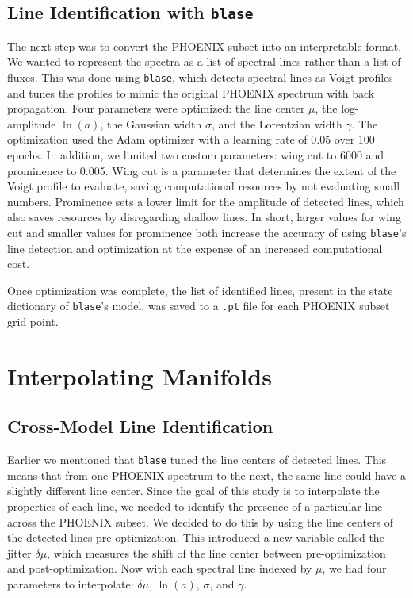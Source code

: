 \documentclass[twocolumn]{aastex631}
\begin{document}
\subsection{Line Identification with \texttt{blase}}
The next step was to convert the PHOENIX subset into an interpretable format.
We wanted to represent the spectra as a list of spectral lines rather than a
list of fluxes. This was done using \texttt{blase}, which detects spectral 
lines as Voigt profiles and tunes the profiles to mimic the original 
PHOENIX spectrum with back propagation. Four parameters were optimized: the 
line center $\mu$, the log-amplitude $\ln(a)$, the Gaussian width $\sigma$, and the 
Lorentzian width $\gamma$. The optimization used the Adam optimizer with a
learning rate of 0.05 over 100 epochs. In addition, we limited two custom 
parameters: wing cut to 6000 and prominence to 0.005. Wing cut is a parameter
that determines the extent of the Voigt profile to evaluate, saving
computational resources by not evaluating small numbers. Prominence sets a
lower limit for the amplitude of detected lines, which also saves resources 
by disregarding shallow lines. In short, larger values for wing cut and 
smaller values for prominence both increase the accuracy of using
\texttt{blase}'s line detection and optimization at the expense of an
increased computational cost.

Once optimization was complete, the list of identified lines, present in the
state dictionary of \texttt{blase}'s model, was saved to a \texttt{.pt} file
for each PHOENIX subset grid point.

\section{Interpolating Manifolds}
\subsection{Cross-Model Line Identification}
Earlier we mentioned that \texttt{blase} tuned the line centers of
detected lines. This means that from one PHOENIX spectrum to the next, the
same line could have a slightly different line center. Since the goal of this
study is to interpolate the properties of each line, we needed to identify the
presence of a particular line across the PHOENIX subset. We decided to do
this by using the line centers of the detected lines pre-optimization. This
introduced a new variable called the jitter $\delta\mu$, which measures the shift of the
line center between pre-optimization and post-optimization. Now with each
spectral line indexed by $\mu$, we had four parameters to interpolate:
$\delta\mu$, $\ln(a)$, $\sigma$, and $\gamma$.
\end{document}
